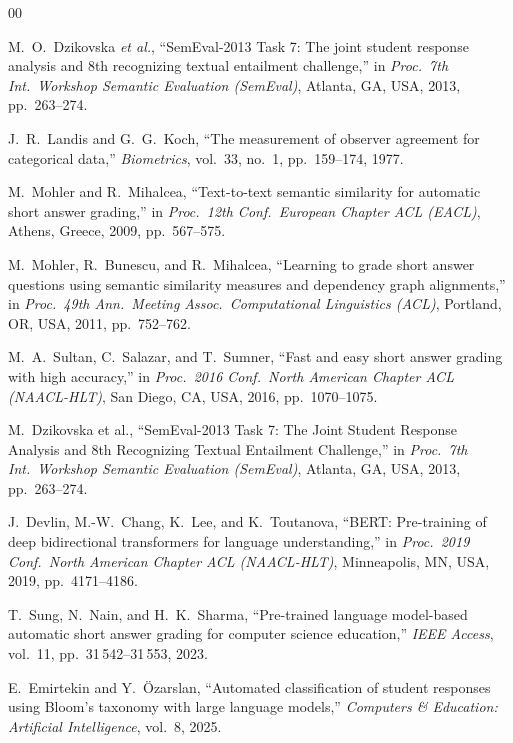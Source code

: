 \documentclass[conference]{IEEEtran}
\begin{document}
\begin{thebibliography}{00}

M.~O.~Dzikovska \emph{et al.},
``SemEval-2013 Task 7: The joint student response analysis and 8th recognizing
textual entailment challenge,''
in \textit{Proc.\ 7th Int.\ Workshop Semantic Evaluation (SemEval)},
Atlanta, GA, USA, 2013, pp.~263--274.

J.~R.~Landis and G.~G.~Koch,
``The measurement of observer agreement for categorical data,''
\textit{Biometrics}, vol.~33, no.~1, pp.~159--174, 1977.

M.~Mohler and R.~Mihalcea,
``Text-to-text semantic similarity for automatic short answer grading,''
in \textit{Proc.\ 12th Conf.\ European Chapter ACL (EACL)},
Athens, Greece, 2009, pp.~567--575.

M.~Mohler, R.~Bunescu, and R.~Mihalcea,
``Learning to grade short answer questions using semantic similarity measures
and dependency graph alignments,''
in \textit{Proc.\ 49th Ann.\ Meeting Assoc.\ Computational Linguistics (ACL)},
Portland, OR, USA, 2011, pp.~752--762.

M.~A.~Sultan, C.~Salazar, and T.~Sumner,
``Fast and easy short answer grading with high accuracy,''
in \textit{Proc.\ 2016 Conf.\ North American Chapter ACL (NAACL-HLT)},
San Diego, CA, USA, 2016, pp.~1070--1075.

M.~Dzikovska et al.,
``SemEval-2013 Task 7: The Joint Student Response Analysis and 8th Recognizing
Textual Entailment Challenge,''
in \textit{Proc.\ 7th Int.\ Workshop Semantic Evaluation (SemEval)},
Atlanta, GA, USA, 2013, pp.~263--274.

J.~Devlin, M.-W.~Chang, K.~Lee, and K.~Toutanova,
``BERT: Pre-training of deep bidirectional transformers for language understanding,''
in \textit{Proc.\ 2019 Conf.\ North American Chapter ACL (NAACL-HLT)},
Minneapolis, MN, USA, 2019, pp.~4171--4186.

T.~Sung, N.~Nain, and H.~K.~Sharma,
``Pre-trained language model-based automatic short answer grading for
computer science education,''
\textit{IEEE Access}, vol.~11, pp.~31\,542--31\,553, 2023.

E.~Emirtekin and Y.~Özarslan,
``Automated classification of student responses using Bloom's taxonomy
with large language models,''
\textit{Computers \& Education: Artificial Intelligence}, vol.~8, 2025.


\end{thebibliography}
\end{document}
